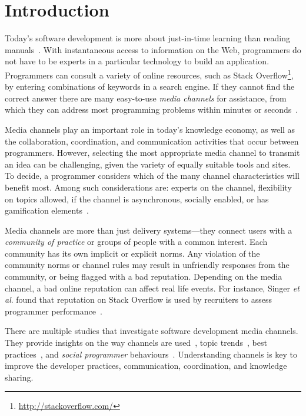 \documentclass{sig-alternate-05-2015}
\begin{document}


\section{Introduction}
\label{cha:introduction}

	Today's software development is more about just-in-time learning than reading manuals~\cite{Hartmann2008}.
	With instantaneous access to information on the Web, programmers do not have to be experts in a particular technology to build an application.
	Programmers can consult a variety of online resources, such as Stack Overflow\footnote{\url{http://stackoverflow.com/}}, by entering combinations of keywords in a search engine.
	If they cannot find the correct answer there are many easy-to-use \textit{media channels} for assistance, from which they can address most programming problems within minutes or seconds~\cite{Mamykina2011}.

	Media channels play an important role in today's knowledge economy, as well as the collaboration, coordination, and communication activities that occur between programmers. However, selecting the most appropriate media channel to transmit an idea can be challenging, given the variety of equally suitable tools and sites.
	To decide, a programmer considers which of the many channel characteristics will benefit most.
	Among such considerations are: experts on the channel, flexibility on topics allowed, if the channel is asynchronous, socially enabled, or has gamification elements~\cite{Vasilescu2014c}.

	Media channels are more than just delivery systems---they connect users with a \textit{community of practice} or groups of people with a common interest.
	Each community has its own implicit or explicit norms.
	Any violation of the community norms or channel rules may result in unfriendly responses from the community, or being flagged with a bad reputation.
	Depending on the media channel, a bad online reputation can affect real life events.
	For instance, Singer \textit{et al}. found that reputation on Stack Overflow is used by recruiters to assess programmer performance~\cite{Singer2013}.

	There are multiple studies that investigate software development media channels.
	They provide insights on the way channels are used~\cite{Guzzi2013, Storey2014, Singer2014},  topic trends~\cite{Barua2012, Kavaler2013, Wang2013d}, best practices~\cite{Asaduzzaman2013, Treude2011, Allamanis2013}, and \textit{social programmer} behaviours~\cite{Lang2013}.
	Understanding channels is key to improve the developer practices, communication, coordination, and knowledge sharing.
\end{document}
